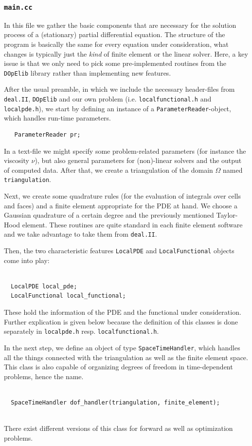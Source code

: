 \documentclass[smallextended]{svjour3}       %
\numberwithin{equation}{section}
\newcommand{\deal}{\texttt{deal.II}}
\newcommand{\dope}{\texttt{DOpElib}}
\begin{document}
\subsubsection{\texttt{main.cc}}
In this file we gather the basic components that are necessary for the
solution process of a (stationary) partial differential equation. The
structure of the program is basically the same for every equation under
consideration, what changes is typically just the \textit{kind} of  finite
element or the linear solver. Here, a key issue is that we only need to pick 
some pre-implemented routines from the \dope{} library rather than 
implementing new features.


After the usual preamble, in which we include the necessary header-files from \deal{}, \dope{} and our own problem (i.e. \texttt{localfunctional.h} and \texttt{localpde.h}), we start by defining an instance of a \texttt{ParameterReader}-object, which handles run-time parameters.
\begin{lstlisting}
   ParameterReader pr;
\end{lstlisting}
In a text-file we might specify some problem-related parameters (for instance the viscosity $\nu$), but also general parameters for (non)-linear solvers and the output of computed data. 
After that, we create a triangulation of the domain $\Omega$ named \texttt{triangulation}.

Next, we create some quadrature rules (for the evaluation of integrals over
cells and faces) and a finite element appropriate for the PDE at hand. We
choose a Gaussian quadrature of a certain degree and the previously mentioned
Taylor-Hood element. These routines are quite standard in each finite element
software and we take advantage to take them from \deal{}.

Then, the two characteristic features \texttt{LocalPDE} and \texttt{LocalFunctional} objects come into play:
\begin{lstlisting}

  LocalPDE local_pde;
  LocalFunctional local_functional;

\end{lstlisting}
These hold the information of the PDE and the functional under consideration. Further explication is given below because
the definition of this classes is done separately in \texttt{localpde.h} resp.   \texttt{localfunctional.h}.

In the next step, we define an object of type \texttt{SpaceTimeHandler}, which handles all the things connected with the triangulation as well as the finite element space. This class is also capable of organizing degrees of freedom in time-dependent problems, hence the name. 
\begin{lstlisting}

  SpaceTimeHandler dof_handler(triangulation, finite_element);
  
\end{lstlisting}
There exist different versions of this class for forward as well as optimization problems. 
\end{document}
